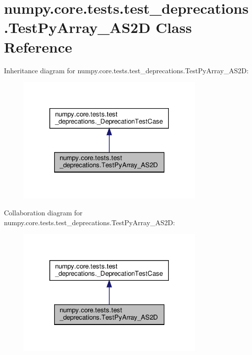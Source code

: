 \hypertarget{classnumpy_1_1core_1_1tests_1_1test__deprecations_1_1TestPyArray__AS2D}{}\section{numpy.\+core.\+tests.\+test\+\_\+deprecations.\+Test\+Py\+Array\+\_\+\+A\+S2D Class Reference}
\label{classnumpy_1_1core_1_1tests_1_1test__deprecations_1_1TestPyArray__AS2D}


Inheritance diagram for numpy.\+core.\+tests.\+test\+\_\+deprecations.\+Test\+Py\+Array\+\_\+\+A\+S2D\+:
\nopagebreak
\begin{figure}[H]
\begin{center}
\leavevmode
\includegraphics[width=261pt]{classnumpy_1_1core_1_1tests_1_1test__deprecations_1_1TestPyArray__AS2D__inherit__graph}
\end{center}
\end{figure}


Collaboration diagram for numpy.\+core.\+tests.\+test\+\_\+deprecations.\+Test\+Py\+Array\+\_\+\+A\+S2D\+:
\nopagebreak
\begin{figure}[H]
\begin{center}
\leavevmode
\includegraphics[width=261pt]{classnumpy_1_1core_1_1tests_1_1test__deprecations_1_1TestPyArray__AS2D__coll__graph}
\end{center}
\end{figure}
